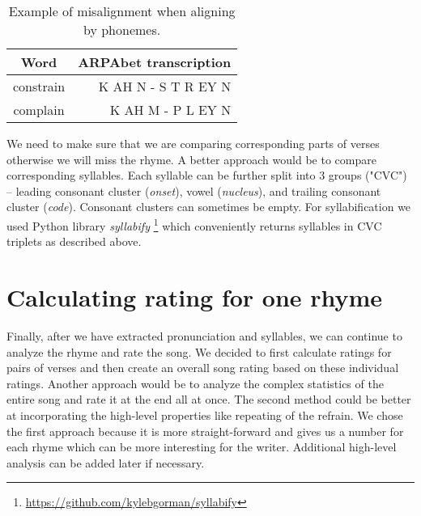\begin{table}[h!]
		\centering
	\begin{tabular}{c r} 
		Word & ARPAbet transcription \\ [0.5ex] 
		\hline
		constrain & K AH N - S T R EY N \\ 
		complain & K AH M - \space\space\space P L EY N \\
	\end{tabular}
	\caption{Example of misalignment when aligning by phonemes.}
	\label{phon_misalign_table}
\end{table}

We need to make sure that we are comparing corresponding parts of verses otherwise we will miss the rhyme. A better approach would be to compare corresponding syllables. Each syllable can be further split into 3 groups ("CVC") -- leading consonant cluster (\textit{onset}), vowel (\textit{nucleus}), and trailing consonant cluster (\textit{code}). Consonant clusters can sometimes be empty. For syllabification we used Python library \textit{syllabify} \footnote{\url{https://github.com/kylebgorman/syllabify}} which conveniently returns syllables in CVC triplets as described above.


\section{Calculating rating for one rhyme}

Finally, after we have extracted pronunciation and syllables, we can continue to analyze the rhyme and rate the song. We decided to first calculate ratings for pairs of verses and then create an overall song rating based on these individual ratings. Another approach would be to analyze the complex statistics of the entire song and rate it at the end all at once. The second method could be better at incorporating the high-level properties like repeating of the refrain. We chose the first approach because it is more straight-forward and gives us a number for each rhyme which can be more interesting for the writer. Additional high-level analysis can be added later if necessary.

